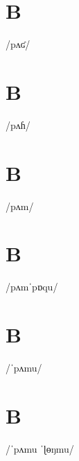\documentclass[10pt,a4paper,twoside]{book}
\begin{document}
\section*{B}

\begin{multicols}{3}
 {/pʌʛ/} {}
\end{multicols}

\section*{B}

\begin{multicols}{3}
 {/pʌɦ/} {}
\end{multicols}

\section*{B}

\begin{multicols}{3}
 {/pʌm/} {}
\end{multicols}

\section*{B}

\begin{multicols}{3}
 {/pʌmˈpɒqu/} {}
\end{multicols}

\section*{B}

\begin{multicols}{3}
 {/ˈpʌmu/} {}
\end{multicols}

\section*{B}

\begin{multicols}{3}
 {/ˈpʌmu ˈɭɵŋmu/} {}
\end{multicols}
\end{document}
